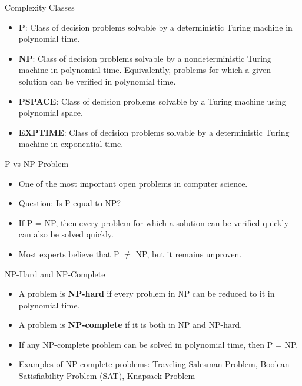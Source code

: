 \documentclass{beamer}
\begin{document}
\begin{frame}{Complexity Classes}
\begin{itemize}
    \item \textbf{P}: Class of decision problems solvable by a deterministic Turing machine in polynomial time.
    \item \textbf{NP}: Class of decision problems solvable by a nondeterministic Turing machine in polynomial time. Equivalently, problems for which a given solution can be verified in polynomial time.
    \item \textbf{PSPACE}: Class of decision problems solvable by a Turing machine using polynomial space.
    \item \textbf{EXPTIME}: Class of decision problems solvable by a deterministic Turing machine in exponential time.
\end{itemize}
\end{frame} 
\begin{frame}{P vs NP Problem}
\begin{itemize}
    \item One of the most important open problems in computer science.
    \item Question: Is P equal to NP?
    \item If P = NP, then every problem for which a solution can be verified quickly can also be solved quickly.
    \item Most experts believe that P $\neq$ NP, but it remains unproven.
\end{itemize}
\end{frame} 
\begin{frame}{NP-Hard and NP-Complete}
\begin{itemize}
    \item A problem is \textbf{NP-hard} if every problem in NP can be reduced to it in polynomial time.
    \item A problem is \textbf{NP-complete} if it is both in NP and NP-hard.
    \item If any NP-complete problem can be solved in polynomial time, then P = NP.
    \item Examples of NP-complete problems: Traveling Salesman Problem, Boolean Satisfiability Problem (SAT), Knapsack Problem
\end{itemize}
\end{frame}
\end{document}
